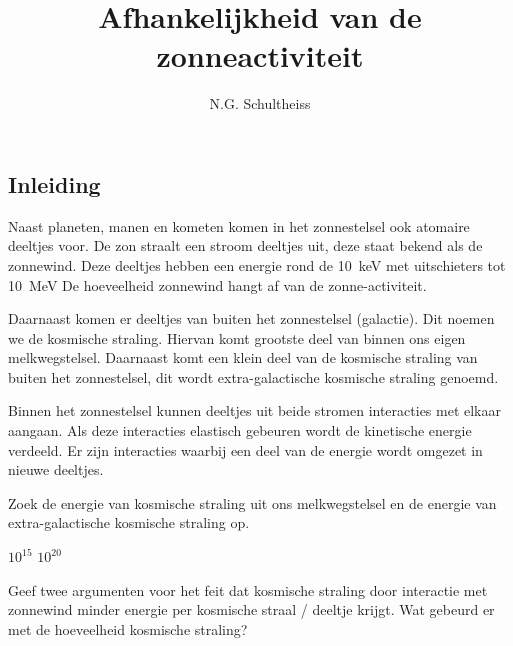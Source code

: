 

\usepackage{lipsum}

\title{Afhankelijkheid van de zonneactiviteit}
\author{N.G. Schultheiss}



\maketitle

\begin{questions}

\begin{EnvUplevel}
\section{Inleiding}

Naast planeten, manen en kometen komen in het zonnestelsel ook atomaire
deeltjes voor. De zon straalt een stroom deeltjes uit, deze staat bekend
als de zonnewind. Deze deeltjes hebben een energie rond de
\SI{10}{\kilo\eV} met uitschieters tot \SI{10}{\MeV} De hoeveelheid
zonnewind hangt af van de zonne-activiteit.

Daarnaast komen er deeltjes van buiten het zonnestelsel (galactie). Dit
noemen we de kosmische straling. Hiervan komt grootste deel van binnen ons
eigen melkwegstelsel. Daarnaast komt een klein deel van de kosmische
straling van buiten het zonnestelsel, dit wordt extra-galactische
kosmische straling genoemd.

Binnen het zonnestelsel kunnen deeltjes uit beide stromen interacties met
elkaar aangaan. Als deze interacties elastisch gebeuren wordt de
kinetische energie verdeeld. Er zijn interacties waarbij een deel van de
energie wordt omgezet in nieuwe deeltjes.
\end{EnvUplevel}

\question Zoek de energie van kosmische straling uit ons melkwegstelsel en
de energie van extra-galactische kosmische straling op.
\begin{solution}
  $10^{15}$ $10^{20}$
\end{solution}

\question Geef twee argumenten voor het feit dat kosmische straling door
interactie met zonnewind minder energie per kosmische straal / deeltje
krijgt. Wat gebeurd er met de hoeveelheid kosmische straling?
\end{questions}
